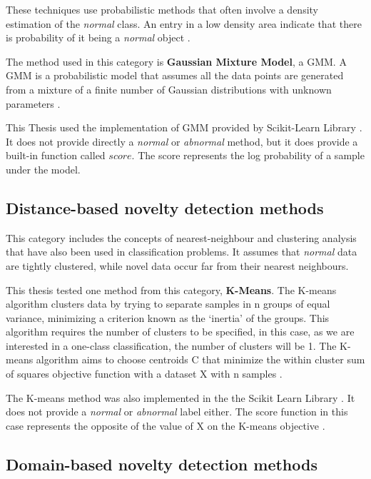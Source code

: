 These techniques use probabilistic methods that often involve a density estimation of the \emph{normal}  class. An entry in a low density area indicate that there is probability of it being a \emph{normal}  object \cite{Pimentel2014}.

The method used in this category is \textbf{Gaussian Mixture Model}, a GMM.
A GMM is a probabilistic model that assumes all the data points are generated from a mixture of a finite number of Gaussian distributions with unknown parameters \cite{scikit-learn}.

This Thesis used the implementation of GMM provided by Scikit-Learn Library \cite{scikit-learn}. It does not provide  directly a \emph{normal} or \emph{abnormal} method, but it does provide a built-in function called $score$. The score represents the log probability of a sample under the model. 

\subsection{Distance-based novelty detection methods}

This category includes the concepts of nearest-neighbour and clustering analysis that have also been used in classification problems. It assumes that \emph{normal}  data are tightly clustered, while novel data occur far from their nearest neighbours. \cite{Pimentel2014}

This thesis tested one method from this category, \textbf{K-Means}. The K-means algorithm clusters data by trying to separate samples in n groups of equal variance, minimizing a criterion known as the ‘inertia’ of the groups. \cite{scikit-learn} This algorithm requires the number of clusters to be specified, in this case, as we are interested in a one-class classification, the number of clusters will be 1. The K-means algorithm aims to choose centroids C that minimize the within cluster sum of squares objective function with a dataset X with n samples \cite{scikit-learn}.

The K-means method was also implemented in the the Scikit Learn Library \cite{scikit-learn}. It does not provide a \emph{normal} or \emph{abnormal} label either. The score function in this case represents the opposite of the value of X on the K-means objective \cite{scikit-learn}.

\subsection{Domain-based novelty detection methods}

